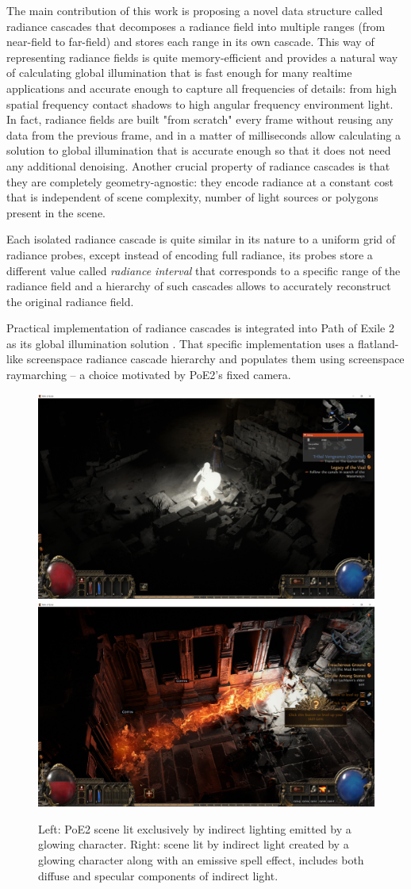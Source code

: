 \documentclass{jcgt}
\begin{document}
The main contribution of this work is proposing a novel data structure called radiance cascades that decomposes a radiance field into multiple ranges (from near-field to far-field) and stores each range in its own cascade. This way of representing radiance fields is quite memory-efficient and provides a natural way of calculating global illumination that is fast enough for many realtime applications and accurate enough to capture all frequencies of details: from high spatial frequency contact shadows to high angular frequency environment light.
In fact, radiance fields are built "from scratch" every frame without reusing any data from the previous frame, and in a matter of milliseconds allow calculating a solution to global illumination that is accurate enough so that it does not need any additional denoising. Another crucial property of radiance cascades is that they are completely geometry-agnostic: they encode radiance
at a constant cost that is independent of scene complexity, number of light sources or polygons present in the scene.

Each isolated radiance cascade is quite similar in its nature to a uniform grid of radiance probes, except instead of encoding full radiance, its probes store a different value called \emph{radiance interval} that corresponds to a specific range of the radiance field and a hierarchy of such cascades allows to accurately reconstruct the original radiance field.

Practical implementation of radiance cascades is integrated into Path of Exile 2 as its global illumination solution . That specific implementation uses a flatland-like screenspace radiance cascade hierarchy and populates them using screenspace raymarching -- a choice motivated by PoE2's fixed camera.

\begin{figure}[htb]
  \centering
  \includegraphics[width=0.49\columnwidth]{images/ranger_gi.png}
  \includegraphics[width=0.49\columnwidth]{images/gi_with_specular.png}
  \caption{\label{fig:poe2gi}
     Left: PoE2 scene lit exclusively by indirect lighting emitted by a glowing character. Right: scene lit by indirect light created by a glowing character along with an emissive spell effect, includes both diffuse and specular components of indirect light.}
\end{figure}
\end{document}
